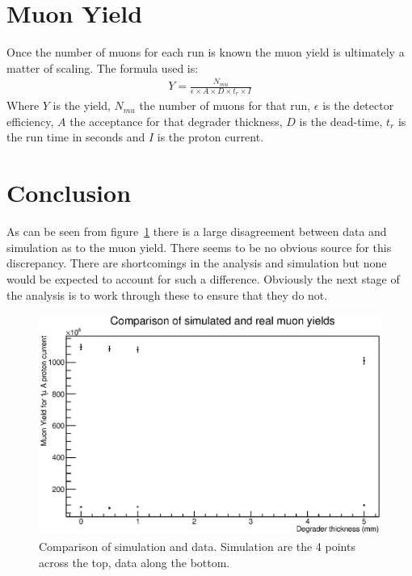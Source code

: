 \documentclass[]{article}
\begin{document}
\section{Muon Yield} %
\label{sec:muon_yield}
Once the number of muons for each run is known the muon yield is ultimately a matter of scaling. The formula used is:
\begin{align}
    Y = \frac{N_{mu}}{\epsilon \times A \times D \times t_{r} \times I}
\end{align}
Where $Y$ is the yield, $N_{mu}$ the number of muons for that run, $\epsilon$ is the detector efficiency, $A$ the acceptance for that degrader thickness, $D$ is the dead-time, $t_{r}$ is the run time in seconds and $I$ is the proton current.
\section{Conclusion} %
\label{sec:conclusion}
As can be seen from figure~\ref{fig:why_its_buggered} there is a large disagreement between data and simulation as to the muon yield. There seems to be no obvious source for this discrepancy. There are shortcomings in the analysis and simulation but none would be expected to account for such a difference. Obviously the next stage of the analysis is to work through these to ensure that they do not. 
\begin{figure}[htbp]
    \centering
        \includegraphics[width=\textwidth]{image/sim_vs_data.eps}
    \caption{Comparison of simulation and data. Simulation are the 4 points across the top, data along the bottom.}
    \label{fig:why_its_buggered}
\end{figure}
\end{document}
